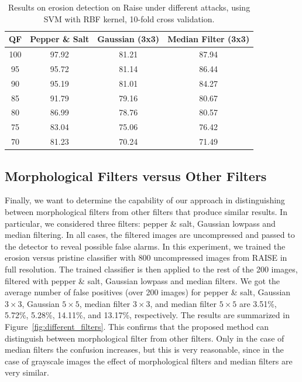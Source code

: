 \documentclass[review]{elsarticle}
\begin{document}
\begin{table}[t!]
	\centering
	\caption{Results on erosion detection on Raise under different attacks, using SVM with RBF kernel, 10-fold cross validation.}
	\label{table:attacks2}
	\begin{tabular}{c|ccc}
		\hline\hline
		\textbf{QF} & \textbf{Pepper \& Salt}&\textbf{Gaussian (3x3)}&\textbf{Median Filter (3x3)}\\
		\hline
		100&97.92&81.21&87.94\\
		95&95.72&81.14&86.44\\
		90&95.19&81.01&84.27\\
		85&91.79&79.16&80.67\\
		80&86.99&78.76&80.57\\
		75&83.04&75.06&76.42\\
		70&81.23&70.24&71.49\\
		\hline\hline	
	\end{tabular}
\end{table}

\subsection{Morphological Filters versus Other Filters }
\label{subsec:results_different_filters}

Finally, we want to determine the capability of our approach in distinguishing between morphological filters from other filters that produce similar results. In particular, we considered three filters: pepper \& salt, Gaussian lowpass and median filtering. In all cases, the filtered images are uncompressed and passed to the detector to reveal possible false alarms. 
In this experiment, we trained the erosion versus pristine classifier with 800 uncompressed images from RAISE in full resolution. The trained classifier is then applied to the rest of the 200 images, filtered with pepper \& salt, Gaussian lowpass and median filters. We got the average number of false positives (over 200 images) for pepper \& salt, Gaussian $3 \times 3$, Gaussian $5 \times 5$, median filter $3 \times 3$, and median filter $5 \times 5$ are 3.51\%, 5.72\%, 5.28\%, 14.11\%, and 13.17\%, respectively. The results are summarized in Figure~\ref{fig:different_filters}.  
This confirms that the proposed method can distinguish between morphological filter from other filters. Only in the case of median filters the confusion increases, but this is very reasonable, since in the case of grayscale images the effect of morphological filters and median filters are very similar.
\end{document}
